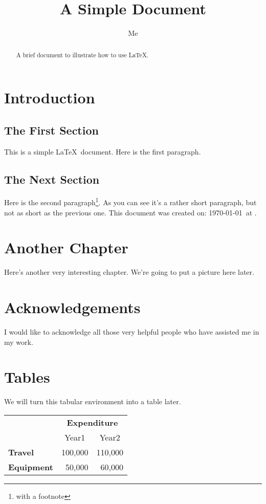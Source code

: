 \documentclass[12pt]{scrreprt}
\title{A Simple Document}
\author{Me}
\begin{document}
\maketitle

\begin{abstract}
A brief document to
illustrate how to use \LaTeX.
\end{abstract}

\chapter{Introduction}

\section{The First Section}

This is a simple \LaTeX\ document.
Here is the first paragraph.

\section{The Next Section}

Here is the second paragraph\footnote{with a footnote}. 
As you can see it's a rather short paragraph, but not 
as short as the previous one. This document was 
created on: \today\ at \currenttime.

\chapter{Another Chapter}

Here's another very interesting chapter.
We're going to put a picture here later.

\chapter*{Acknowledgements}

I would like to acknowledge all those
very helpful people who have assisted
me in my work.

\appendix
\chapter{Tables}

We will turn this tabular environment into a table later.

\begin{tabular}{lrr}
 & \multicolumn{2}{c}{\bfseries Expenditure}\\
 & \multicolumn{1}{c}{Year1} & \multicolumn{1}{c}{Year2}\\
\bfseries Travel & 100,000 & 110,000\\
\bfseries Equipment & 50,000 & 60,000
\end{tabular}
\end{document}
